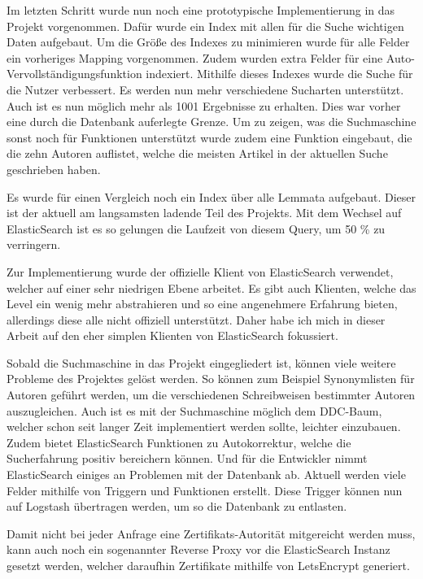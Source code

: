 Im letzten Schritt wurde nun noch eine prototypische Implementierung in das Projekt vorgenommen. Dafür wurde ein Index mit allen für die Suche wichtigen Daten aufgebaut. Um die Größe des Indexes zu minimieren wurde für alle Felder ein vorheriges Mapping vorgenommen. Zudem wurden extra Felder für eine Auto-Vervollständigungsfunktion indexiert. Mithilfe dieses Indexes wurde die Suche für die Nutzer verbessert. Es werden nun mehr verschiedene Sucharten unterstützt. Auch ist es nun möglich mehr als 1001 Ergebnisse zu erhalten. Dies war vorher eine durch die Datenbank auferlegte Grenze. Um zu zeigen, was die Suchmaschine sonst noch für Funktionen unterstützt wurde zudem eine Funktion eingebaut, die die zehn Autoren auflistet, welche die meisten Artikel in der aktuellen Suche geschrieben haben. 

Es wurde für einen Vergleich noch ein Index über alle Lemmata aufgebaut. Dieser ist der aktuell am langsamsten ladende Teil des Projekts. Mit dem Wechsel auf ElasticSearch ist es so gelungen die Laufzeit von diesem Query, um 50 \% zu verringern. 

Zur Implementierung wurde der offizielle Klient von ElasticSearch verwendet, welcher auf einer sehr niedrigen Ebene arbeitet. Es gibt auch Klienten, welche das Level ein wenig mehr abstrahieren und so eine angenehmere Erfahrung bieten, allerdings diese alle nicht offiziell unterstützt. Daher habe ich mich in dieser Arbeit auf den eher simplen Klienten von ElasticSearch fokussiert. 

Sobald die Suchmaschine in das Projekt eingegliedert ist, können viele weitere Probleme des Projektes gelöst werden. So können zum Beispiel Synonymlisten für Autoren geführt werden, um die verschiedenen Schreibweisen bestimmter Autoren auszugleichen. Auch ist es mit der Suchmaschine möglich dem DDC-Baum, welcher schon seit langer Zeit implementiert werden sollte, leichter einzubauen. Zudem bietet ElasticSearch Funktionen zu Autokorrektur, welche die Sucherfahrung positiv bereichern können. Und für die Entwickler nimmt ElasticSearch einiges an Problemen mit der Datenbank ab. Aktuell werden viele Felder mithilfe von Triggern und Funktionen erstellt. Diese Trigger können nun auf Logstash übertragen werden, um so die Datenbank zu entlasten.

Damit nicht bei jeder Anfrage eine Zertifikats-Autorität mitgereicht werden muss, kann auch noch ein sogenannter Reverse Proxy vor die ElasticSearch Instanz gesetzt werden, welcher daraufhin Zertifikate mithilfe von LetsEncrypt generiert.

